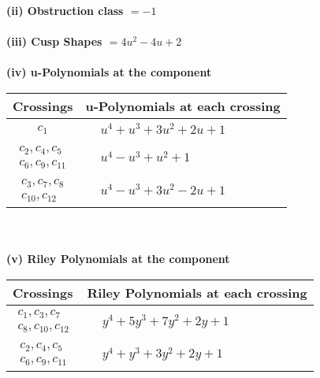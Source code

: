 \documentclass[1p]{elsarticle_modified}
\theoremstyle{definition}
\begin{document}
\flushleft \textbf{(ii) Obstruction class $= -1$}\\~\\
\flushleft \textbf{(iii) Cusp Shapes $= 4 u^2-4 u+2$}\\~\\
\newpage\renewcommand{\arraystretch}{1}
\flushleft \textbf{(iv) u-Polynomials at the component}\newline \\
\begin{tabular}{m{50pt}|m{274pt}}
Crossings & \hspace{64pt}u-Polynomials at each crossing \\
\hline $$\begin{aligned}c_{1}\end{aligned}$$&$\begin{aligned}
&u^4+u^3+3 u^2+2 u+1
\end{aligned}$\\
\hline $$\begin{aligned}c_{2},c_{4},c_{5}\\c_{6},c_{9},c_{11}\end{aligned}$$&$\begin{aligned}
&u^4- u^3+u^2+1
\end{aligned}$\\
\hline $$\begin{aligned}c_{3},c_{7},c_{8}\\c_{10},c_{12}\end{aligned}$$&$\begin{aligned}
&u^4- u^3+3 u^2-2 u+1
\end{aligned}$\\
\hline
\end{tabular}\\~\\
\newpage\renewcommand{\arraystretch}{1}
\flushleft \textbf{(v) Riley Polynomials at the component}\newline \\
\begin{tabular}{m{50pt}|m{274pt}}
Crossings & \hspace{64pt}Riley Polynomials at each crossing \\
\hline $$\begin{aligned}c_{1},c_{3},c_{7}\\c_{8},c_{10},c_{12}\end{aligned}$$&$\begin{aligned}
&y^4+5 y^3+7 y^2+2 y+1
\end{aligned}$\\
\hline $$\begin{aligned}c_{2},c_{4},c_{5}\\c_{6},c_{9},c_{11}\end{aligned}$$&$\begin{aligned}
&y^4+y^3+3 y^2+2 y+1
\end{aligned}$\\
\hline
\end{tabular}\\~\\
\end{document}
